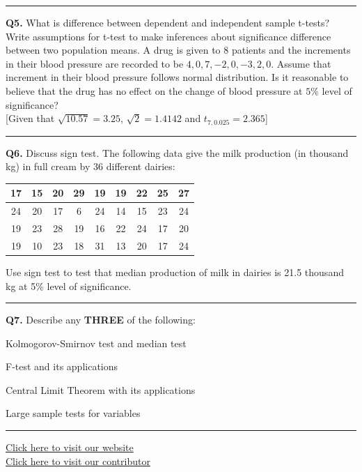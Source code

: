 \documentclass[11pt,a4paper]{article}
\begin{document}
\medskip\rule{\linewidth}{0.2pt}\medskip




\noindent   \textbf{Q5.} What is difference between dependent and independent sample t-tests? Write assumptions for t-test to make inferences about significance difference between two population means. A drug is given to 8 patients and the increments in their blood pressure are recorded to be $4, 0, 7, -2, 0, -3, 2, 0$. Assume that increment in their blood pressure follows normal distribution. Is it reasonable to believe that the drug has no effect on the change of blood pressure at $5\%$ level of significance? \\
{[Given that $\sqrt{10.57} = 3.25$, $\sqrt{2} = 1.4142$ and $t_{7, 0.025} = 2.365$]}

\medskip\rule{\linewidth}{0.2pt}\medskip




\noindent   \textbf{Q6.} Discuss sign test. The following data give the milk production (in thousand kg) in full cream by 36 different dairies:

\begin{center}
\small

\begin{tabular}{|c|c|c|c|c|c|c|c|c|}
  \hline
  17 & 15 & 20 & 29 & 19 & 19 & 22 & 25 & 27 \\ \hline
  24 & 20 & 17 & 6 & 24 & 14 & 15 & 23 & 24 \\ \hline
  19 & 23 & 28 & 19 & 16 & 22 & 24 & 17 & 20 \\ \hline
  19 & 10 & 23 & 18 & 31 & 13 & 20 & 17 & 24 \\ \hline
\end{tabular}
\end{center}
Use sign test to test that median production of milk in dairies is 21.5 thousand kg at 5\% level of significance.

\medskip\rule{\linewidth}{0.2pt}\medskip




\noindent   \textbf{Q7.} Describe any   \textbf{THREE} of the following:

\begin{parts}
  \item Kolmogorov-Smirnov test and median test
  \item F-test and its applications
  \item Central Limit Theorem with its applications
  \item Large sample tests for variables
\end{parts}

\vfill
\rule{\linewidth}{0.4pt}

\begin{center}\small
\href{https://bhu-exam.vercel.app/}{Click here to visit our website}\\[4pt]
\href{https://me-aryan.vercel.app/}{Click here to visit our contributor}
\end{center}
\end{document}
